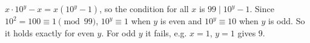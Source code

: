$x\cdot10^y-x=x\left(10^y-1\right)$, so the condition for all $x$ is $99\mid10^y-1$. Since $10^2=100\equiv1\pmod{99}$, $10^y\equiv1$ when $y$ is even and $10^y\equiv10$ when $y$ is odd. So it holds exactly for $\boxed{\text{even }y}$. For odd $y$ it fails, e.g. $x=1$, $y=1$ gives $9$.
